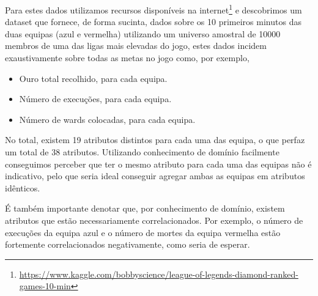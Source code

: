 Para estes dados utilizamos recursos disponíveis na internet\footnote{\url{https://www.kaggle.com/bobbyscience/league-of-legends-diamond-ranked-games-10-min}} e descobrimos um dataset que fornece, de forma sucinta, dados sobre os 10 primeiros minutos das duas equipas (azul e vermelha) utilizando um universo amostral de 10000 membros de uma das ligas mais elevadas do jogo, estes dados incidem exaustivamente sobre todas as metas no jogo como, por exemplo,

\begin{itemize}
    \item Ouro total recolhido, para cada equipa.
    \item Número de execuções, para cada equipa.
    \item Número de wards colocadas, para cada equipa.
\end{itemize}

No total, existem 19 atributos distintos para cada uma das equipa, o que perfaz um total de 38 atributos. Utilizando conhecimento de domínio facilmente conseguimos perceber que ter o mesmo atributo para cada uma das equipas não é indicativo, pelo que seria ideal conseguir agregar ambas as equipas em atributos idênticos.

É também importante denotar que, por conhecimento de domínio, existem atributos que estão necessariamente correlacionados. Por exemplo, o número de execuções da equipa azul e o número de mortes da equipa vermelha estão fortemente correlacionados negativamente, como seria de esperar.